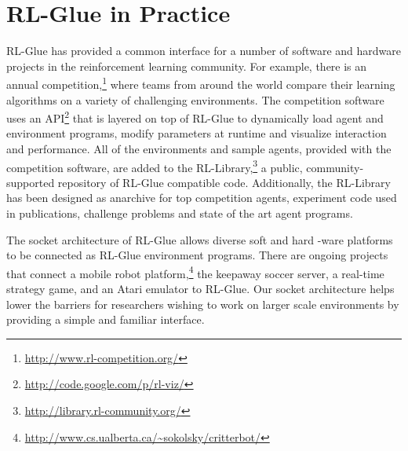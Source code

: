 \documentclass[twoside,11pt]{article}
\begin{document}





\section{RL-Glue in Practice}
RL-Glue has provided a common interface for a number of software and hardware projects in the reinforcement learning community.  For example, there is an annual competition,\footnote{\url{http://www.rl-competition.org/}} where teams from around the world compare their learning algorithms on a variety of challenging environments.  The competition software uses an API\footnote{\url{http://code.google.com/p/rl-viz/}} that is layered on top of RL-Glue to dynamically load agent and environment programs, modify parameters at runtime and visualize interaction and performance.  All of the environments and sample agents, provided with the competition software, are added to the RL-Library,\footnote{\url{http://library.rl-community.org/}} a public, community-supported repository of RL-Glue compatible code. Additionally, the RL-Library has been designed as anarchive for top competition agents, experiment code used in publications, challenge problems and state of the art agent programs. 



The socket architecture of RL-Glue allows diverse soft and hard -ware platforms to be connected as RL-Glue environment programs.  There are ongoing projects that connect a mobile robot platform,\footnote{\url{http://www.cs.ualberta.ca/~sokolsky/critterbot/}} the keepaway soccer server, a real-time strategy game, and an Atari emulator to RL-Glue. Our socket architecture helps lower the barriers for researchers wishing to work on larger scale environments by providing a simple and familiar interface. %
\end{document}

